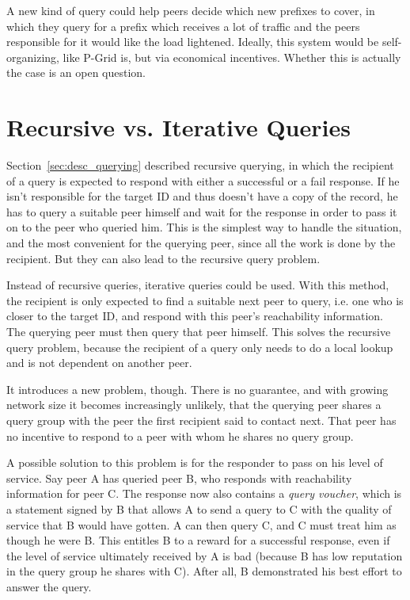 A new kind of query could help peers decide which new prefixes to cover, in
which they query for a prefix which receives a lot of traffic and the peers
responsible for it would like the load lightened. Ideally, this system would be
self-organizing, like P-Grid is, but via economical incentives. Whether this is
actually the case is an open question.

\section{Recursive vs. Iterative Queries}
\label{sec:desc_recursive_vs_iterative}
Section~\ref{sec:desc_querying} described recursive querying, in which the
recipient of a query is expected to respond with either a successful or a fail
response. If he isn't responsible for the target ID and thus doesn't have a copy
of the record, he has to query a suitable peer himself and wait for the response
in order to pass it on to the peer who queried him. This is the simplest way to
handle the situation, and the most convenient for the querying peer, since all
the work is done by the recipient. But they can also lead to the recursive query
problem.

Instead of recursive queries, iterative queries could be used. With this method,
the recipient is only expected to find a suitable next peer to query, i.e.  one
who is closer to the target ID, and respond with this peer's reachability
information. The querying peer must then query that peer himself. This solves
the recursive query problem, because the recipient of a query only needs to do a
local lookup and is not dependent on another peer.

It introduces a new problem, though. There is no guarantee, and with growing
network size it becomes increasingly unlikely, that the querying peer shares a
query group with the peer the first recipient said to contact next. That peer
has no incentive to respond to a peer with whom he shares no query group.

A possible solution to this problem is for the responder to pass on his level of
service. Say peer A has queried peer B, who responds with reachability
information for peer C. The response now also contains a \emph{query voucher},
which is a statement signed by B that allows A to send a query to C with the
quality of service that B would have gotten. A can then query C, and C must
treat him as though he were B. This entitles B to a reward for a successful
response, even if the level of service ultimately received by A is bad (because
B has low reputation in the query group he shares with C). After all, B
demonstrated his best effort to answer the query.

